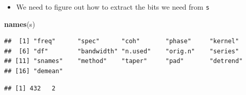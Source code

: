 \documentclass[]{article}
\newenvironment{Shaded}{\begin{snugshade}}{\end{snugshade}}
\newcommand{\KeywordTok}[1]{\textcolor[rgb]{0.13,0.29,0.53}{\textbf{#1}}}
\newcommand{\DataTypeTok}[1]{\textcolor[rgb]{0.13,0.29,0.53}{#1}}
\newcommand{\DecValTok}[1]{\textcolor[rgb]{0.00,0.00,0.81}{#1}}
\newcommand{\FloatTok}[1]{\textcolor[rgb]{0.00,0.00,0.81}{#1}}
\newcommand{\StringTok}[1]{\textcolor[rgb]{0.31,0.60,0.02}{#1}}
\newcommand{\OperatorTok}[1]{\textcolor[rgb]{0.81,0.36,0.00}{\textbf{#1}}}
\newcommand{\NormalTok}[1]{#1}
\providecommand{\tightlist}{%
  \setlength{\itemsep}{0pt}\setlength{\parskip}{0pt}}
\begin{document}
\begin{itemize}
\tightlist
\item
  We need to figure out how to extract the bits we need from \texttt{s}
\end{itemize}

\begin{Shaded}
\begin{Highlighting}[]
\KeywordTok{names}\NormalTok{(s)}
\end{Highlighting}
\end{Shaded}

\begin{verbatim}
##  [1] "freq"      "spec"      "coh"       "phase"     "kernel"   
##  [6] "df"        "bandwidth" "n.used"    "orig.n"    "series"   
## [11] "snames"    "method"    "taper"     "pad"       "detrend"  
## [16] "demean"
\end{verbatim}

\begin{Shaded}
\end{Shaded}

\begin{verbatim}
## [1] 432   2
\end{verbatim}

\begin{Shaded}
\end{Shaded}
\end{document}
